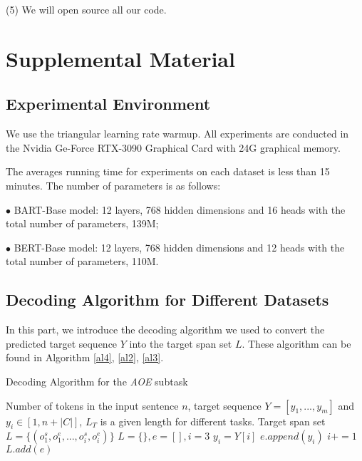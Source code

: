 \documentclass[11pt,a4paper]{article}
\begin{document}
(5) We will open source all our code.







\clearpage
\appendix
\section{Supplemental Material}

\subsection{Experimental Environment} \label{supply:random_search}


We use the triangular learning rate warmup. All experiments are conducted in the Nvidia Ge-Force RTX-3090 Graphical Card with 24G graphical memory. 

The averages running time for experiments on each dataset is less than 15 minutes. The number of parameters is as follows:

$\bullet$ BART-Base model: 12 layers, 768 hidden dimensions and 16 heads with the total number of parameters, 139M;

$\bullet$ BERT-Base model: 12 layers, 768 hidden dimensions and 12 heads with the total number of parameters, 110M.





\subsection{Decoding Algorithm for Different Datasets}
In this part, we introduce the decoding algorithm we used to convert the predicted target sequence $Y$ into the target span set $L$.  These algorithm can be found in Algorithm \ref{al4}, \ref{al2}, \ref{al3}.

\begin{algorithm}[!h]
  \begin{algorithmic}[1]
    \caption{Decoding Algorithm for the \emph{AOE} subtask} \label{al4}
    \Require Number of tokens in the input sentence $n$, target sequence $Y=[y_1, ..., y_m]$ and $y_i \in [1, n+|C|]$, $L_T$ is a given length for different tasks.
    \Ensure  Target span set $L=\{(o_1^s, o_1^e, ..., o_i^s, o_i^e)\}$
    \State $L=\{\}, e=[], i=3$
      \State $y_i = Y[i]$
      \State $e.append(y_i)$
      \State $i+=1$
    \EndWhile
    \State $L.add(e)$
    \State {}
  \end{algorithmic}  
\end{algorithm}
\end{document}
